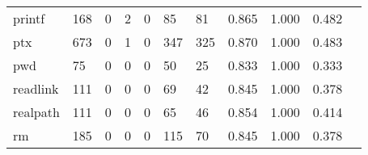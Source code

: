 \begin{longtable}{lp{1.2cm}p{1.2cm}p{1.2cm}p{1.2cm}p{1.2cm}p{1.2cm}p{1.2cm}p{1.2cm}p{1.2cm}p{1.2cm}}
printf    &                                   168 &                                                  0 &                                                  2 &                                                  0 &                                                 85 &                                                 81 &                                              0.865 &                                              1.000 &                                              0.482 \\
ptx       &                                   673 &                                                  0 &                                                  1 &                                                  0 &                                                347 &                                                325 &                                              0.870 &                                              1.000 &                                              0.483 \\
pwd       &                                    75 &                                                  0 &                                                  0 &                                                  0 &                                                 50 &                                                 25 &                                              0.833 &                                              1.000 &                                              0.333 \\
readlink  &                                   111 &                                                  0 &                                                  0 &                                                  0 &                                                 69 &                                                 42 &                                              0.845 &                                              1.000 &                                              0.378 \\
realpath  &                                   111 &                                                  0 &                                                  0 &                                                  0 &                                                 65 &                                                 46 &                                              0.854 &                                              1.000 &                                              0.414 \\
rm        &                                   185 &                                                  0 &                                                  0 &                                                  0 &                                                115 &                                                 70 &                                              0.845 &                                              1.000 &                                              0.378 \\

\end{longtable}
